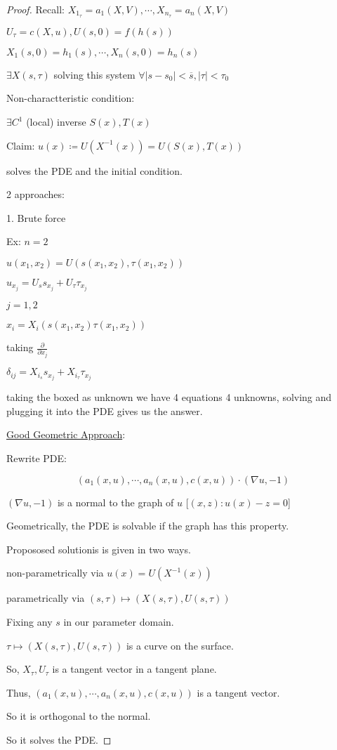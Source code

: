 \documentclass{article}
\theoremstyle{definition}
\begin{document}
\begin{proof}
    Recall: \(X_{1_\tau}=a_1(X,V),\cdots,X_{n_\tau}=a_n(X,V)\)

    \(U_\tau = c(X,u),U(s,0)=f(h(s))\) 
    
    \(X_1(s,0)=h_1(s),\cdots,X_n(s,0)=h_n(s)\) 

    \(\exists X(s,\tau)\) solving this system \(\forall \vert s - s_0\vert < \overline{s} , \vert \tau \vert < \tau_0 \) 
    
    Non-charactteristic condition:

    \(\exists C^1\) (local) inverse \(S(x),T(x)\)
    
    Claim: \(u(x)\coloneqq U(X ^{-1} (x))=U(S(x),T(x))\)
    
    solves the PDE and the initial condition.

    2 approaches:

    1. Brute force

    Ex: \(n=2\) 

    \(u(x_1,x_2)=U(s(x_1,x_2),\tau(x_1,x_2))\) 

    \(u_{x_j}=U_s s_{x_j}+U_\tau\tau_{x_j}\) 

    \(j=1,2\) 

    \(x_i = X_i(s(x_1,x_2)\tau(x_1,x_2))\) 

    taking \(\frac{\partial}{\partial x_j}\)
    
    \(\delta_{ij}=X_{i_s}\boxed{s_{x_j}}+X_{i_\tau}\boxed{\tau_{x_j}}\) 

    taking the boxed as unknown we have 4 equations 4 unknowns, solving and plugging it into the PDE gives us the answer.

    \underline{Good Geometric Approach}:

    Rewrite PDE:

    \[
        (a_1(x,u),\cdots,a_n(x,u),c(x,u))\cdot (\nabla u, -1)
    \]

    \((\nabla u, -1)\) is a normal to the graph of \(u\) [\((x,z):u(x)-z=0\)]

    Geometrically, the PDE is solvable if the graph has this property.

    Propososed solutionis is given in two ways.

    non-parametrically via \(u(x) = U(X ^{-1} (x))\) 

    parametrically via \((s,\tau) \mapsto (X(s,\tau),U(s,\tau))\)
    
    Fixing any \(s\) in our parameter domain.

    \(\tau \mapsto (X(s,\tau),U(s,\tau))\) is a curve on the surface. 

    So, \(X_\tau, U_\tau\) is a tangent vector in a tangent plane.

    Thus, \((a_1(x,u),\cdots, a_n(x,u),c(x,u))\) is a tangent vector.

    So it is orthogonal to the normal.

    So it solves the PDE.
    
\end{proof}
\end{document}
